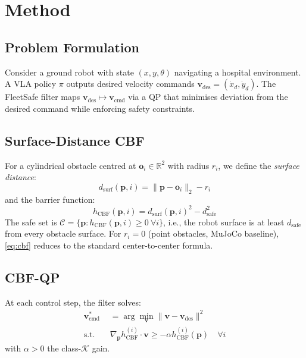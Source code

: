 \documentclass[letterpaper]{article}
\newcommand{\hcbf}{h_{\text{CBF}}}
\newcommand{\dsafe}{d_{\text{safe}}}
\newcommand{\dsurf}{d_{\text{surf}}}
\newcommand{\vdes}{\mathbf{v}_{\text{des}}}
\newcommand{\vcmd}{\mathbf{v}_{\text{cmd}}}
\begin{document}
\section{Method}
\label{sec:method}

\subsection{Problem Formulation}
Consider a ground robot with state $(x, y, \theta)$ navigating a hospital
environment. A VLA policy $\pi$ outputs desired velocity commands
$\vdes = (\dot{x}_d, \dot{y}_d)$. The FleetSafe filter maps
$\vdes \mapsto \vcmd$ via a QP that minimises deviation from the desired
command while enforcing safety constraints.

\subsection{Surface-Distance CBF}
For a cylindrical obstacle centred at $\mathbf{o}_i \in \mathbb{R}^2$
with radius $r_i$, we define the \emph{surface distance}:
\begin{equation}
  \dsurf(\mathbf{p}, i) = \|\mathbf{p} - \mathbf{o}_i\|_2 - r_i
\end{equation}
and the barrier function:
\begin{equation}
  \hcbf(\mathbf{p}, i) = \dsurf(\mathbf{p}, i)^2 - \dsafe^2
  \label{eq:cbf}
\end{equation}
The safe set is $\mathcal{C} = \{\mathbf{p} : \hcbf(\mathbf{p}, i) \geq 0\
\forall i\}$, i.e., the robot surface is at least $\dsafe$ from every
obstacle surface. For $r_i = 0$ (point obstacles, MuJoCo baseline),
\eqref{eq:cbf} reduces to the standard center-to-center formula.

\subsection{CBF-QP}
At each control step, the filter solves:
\begin{align}
  \vcmd^* &= \arg\min_{\mathbf{v}} \|\mathbf{v} - \vdes\|^2 \label{eq:qp}\\
  \text{s.t.} \quad & \nabla_{\mathbf{p}} \hcbf^{(i)} \cdot \mathbf{v} \geq -\alpha \hcbf^{(i)}(\mathbf{p})
    \quad \forall i \nonumber
\end{align}
with $\alpha > 0$ the class-$\mathcal{K}$ gain.
\end{document}
